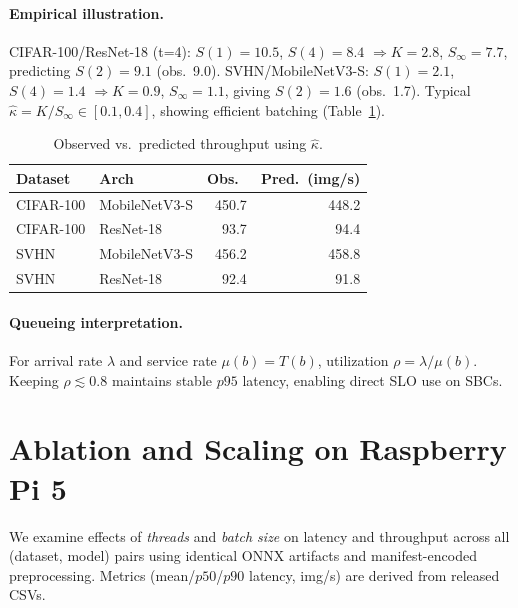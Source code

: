 \documentclass{article}
\begin{document}
\paragraph{Empirical illustration.}
CIFAR-100/ResNet-18 (t=4): $S(1)=10.5$, $S(4)=8.4$ $\Rightarrow K=2.8$, $S_{\infty}=7.7$, predicting $S(2)=9.1$ (obs.\ 9.0).  
SVHN/MobileNetV3-S: $S(1)=2.1$, $S(4)=1.4$ $\Rightarrow K=0.9$, $S_{\infty}=1.1$, giving $S(2)=1.6$ (obs.\ 1.7).  
Typical $\hat{\kappa}{=}K/S_{\infty}\!\in[0.1,0.4]$, showing efficient batching (Table~\ref{tab:throughput-model}).

\begin{table}[h]
\centering
\footnotesize
\caption{Observed vs.\ predicted throughput using $\hat{\kappa}$.}
\label{tab:throughput-model}
\begin{tabularx}{\columnwidth}{l l r r}
\toprule
Dataset & Arch & Obs.\ & Pred.\ (img/s) \\
\midrule
CIFAR-100 & MobileNetV3-S & 450.7 & 448.2 \\
CIFAR-100 & ResNet-18 & 93.7 & 94.4 \\
SVHN & MobileNetV3-S & 456.2 & 458.8 \\
SVHN & ResNet-18 & 92.4 & 91.8 \\
\bottomrule
\end{tabularx}
\end{table}

\paragraph{Queueing interpretation.}
For arrival rate $\lambda$ and service rate $\mu(b){=}T(b)$, utilization $\rho=\lambda/\mu(b)$.  
Keeping $\rho\!\lesssim\!0.8$ maintains stable $p95$ latency, enabling direct SLO use on SBCs.

\section{Ablation and Scaling on Raspberry Pi 5}
\label{sec:ablation}

We examine effects of \emph{threads} and \emph{batch size} on latency and throughput across all (dataset, model) pairs using identical ONNX artifacts and manifest-encoded preprocessing.  
Metrics (mean/$p50$/$p90$ latency, img/s) are derived from released CSVs.
\end{document}
